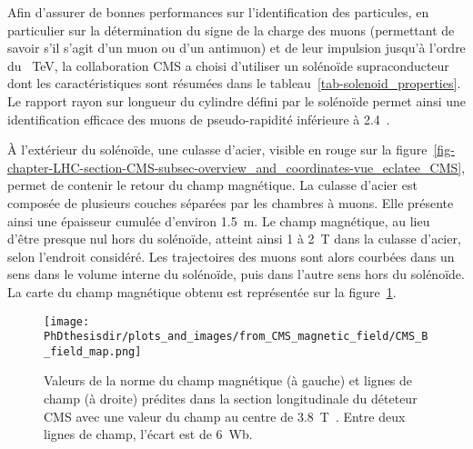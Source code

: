 \par Afin d'assurer de bonnes performances sur l'identification des particules, en particulier sur la détermination du signe de la charge des muons (permettant de savoir s'il s'agit d'un muon ou d'un antimuon) et de leur impulsion jusqu'à l'ordre du \SI{}{\TeV}, la collaboration CMS a choisi d'utiliser un solénoïde supraconducteur~\cite{cms_paper,CERN-LHCC-97-010,CMS_TDR_1,CMS_magnet} dont les caractéristiques sont résumées dans le tableau~\ref{tab-solenoid_properties}.
Le rapport rayon sur longueur du cylindre défini par le solénoïde permet ainsi une identification efficace des muons de pseudo-rapidité inférieure à \num{2.4}~\cite{CERN-LHCC-97-010}.
\par À l'extérieur du solénoïde, une culasse d'acier, visible en rouge sur la figure~\ref{fig-chapter-LHC-section-CMS-subsec-overview_and_coordinates-vue_eclatee_CMS}, permet de contenir le retour du champ magnétique.
La culasse d'acier est composée de plusieurs couches séparées par les chambres à muons.
Elle présente ainsi une épaisseur cumulée d'environ \SI{1.5}{\meter}.
Le champ magnétique, au lieu d'être presque nul hors du solénoïde, atteint ainsi \num{1} à \SI{2}{\tesla} dans la culasse d'acier, selon l'endroit considéré.
Les trajectoires des muons sont alors courbées dans un sens dans le volume interne du solénoïde, puis dans l'autre sens hors du solénoïde.
La carte du champ magnétique obtenu est représentée sur la figure~\ref{fig-chapter-LHC-section-CMS-subsec-solenoide-CMS_B_field_map}.
\begin{figure}[h]
\centering
\texttt{[image: \\PhDthesisdir/plots\_and\_images/from\_CMS\_magnetic\_field/CMS\_B\_field\_map.png]}
\caption[Champ magnétique dans le détecteur CMS.]{Valeurs de la norme du champ magnétique (à gauche) et lignes de champ (à droite) prédites dans la section longitudinale du déteteur CMS avec une valeur du champ au centre de \SI{3.8}{\tesla}~\cite{CMS_magnetic_field}. Entre deux lignes de champ, l'écart est de \SI{6}{\weber}.}
\label{fig-chapter-LHC-section-CMS-subsec-solenoide-CMS_B_field_map}
\end{figure}